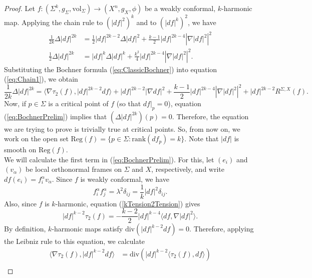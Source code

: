\documentclass[11pt]{article}
\newcommand{\vol}{\mathrm{vol}}
\theoremstyle{definition}
\numberwithin{equation}{section}
\begin{document}
\begin{proof} Let $f \colon (\Sigma^k, g_\Sigma, \vol_\Sigma) \to (X^n, g_X, \phi)$ be a weakly conformal, $k$-harmonic map.  Applying the chain rule to $(|df|^2)^k$ and to $(|df|^k)^2$, we have
\begin{align}
\frac{1}{2k} \Delta |df|^{2k} & = \frac{1}{2} |df|^{2k-2} \Delta |df|^2 + \frac{k-1}{2} |df|^{2k-4} \left| \nabla |df|^2 \right|^2 \label{eq:Chain1} \\
\frac{1}{2} \Delta |df|^{2k} & = |df|^k \Delta |df|^k + \frac{k^2}{4} |df|^{2k-4} \left| \nabla |df|^2 \right|^2. \label{eq:Chain2}
\end{align}
Substituting the Bochner formula (\ref{eq:ClassicBochner}) into equation (\ref{eq:Chain1}), we obtain
\begin{equation}
\frac{1}{2k} \Delta |df|^{2k} = \langle \nabla \tau_2(f), |df|^{2k-2}df \rangle + |df|^{2k-2} | \nabla df |^2 + \frac{k-1}{2}|df|^{2k-4} \left| \nabla |df|^2 \right|^2 + |df|^{2k-2} R^{\Sigma, X}(f).
\label{eq:BochnerPrelim}
\end{equation}
Now, if $p \in \Sigma$ is a critical point of $f$ (so that $df|_p = 0$), equation (\ref{eq:BochnerPrelim}) implies that $(\Delta |df|^{2k})(p) = 0$.  Therefore, the equation we are trying to prove is trivially true at critical points.  So, from now on, we work on the open set $\mathrm{Reg}(f) = \{p \in \Sigma \colon \mathrm{rank}(df_p) = k\}$.  Note that $|df|$ is smooth on $\mathrm{Reg}(f)$. \\
\indent We will calculate the first term in (\ref{eq:BochnerPrelim}).  For this, let $(e_i)$ and $(v_\alpha)$ be local orthonormal frames on $\Sigma$ and $X$, respectively, and write $df(e_i) = f^\alpha_i v_\alpha$.  Since $f$ is weakly conformal, we have
\begin{equation} \label{eq:ConformalCoordinates}
f^\alpha_i f^\alpha_j = \lambda^2 \delta_{ij} = \frac{1}{k}|df|^2 \delta_{ij}.
\end{equation}
Also, since $f$ is $k$-harmonic, equation (\ref{kTension2Tension}) gives
\begin{equation}
|df|^{k-2} \tau_2(f) = -\frac{k-2}{2} |df|^{k-4} \langle df, \nabla |df|^2 \rangle.
\label{eq:2tension}
\end{equation}
By definition, $k$-harmonic maps satisfy $\mathrm{div}( |df|^{k-2} df) = 0$.  Therefore, applying the Leibniz rule to this equation, we calculate
\begin{align*}
\langle \nabla \tau_2(f), |df|^{k-2} df \rangle & = \mathrm{div}(   |df|^{k-2}  \langle\tau_2(f), df \rangle) \\

\end{align*}
\end{proof}
\end{document}
